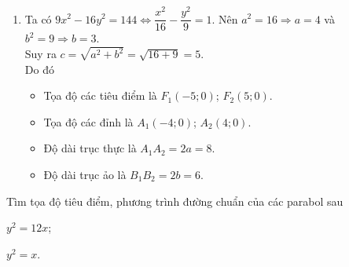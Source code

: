 \begin{baitap}
{\begin{enumerate}
\begin{itemize}
				\item Tọa độ các đỉnh là $A_1 (-4;0)$; $A_2 (4;0)$.
				\item Độ dài trục thực là $A_1 A_2=2a=8$.
				\item Độ dài trục ảo là $B_1 B_2=2b=2$.
			\end{itemize}
			\item Ta có $9x^2-16y^2=144 \Leftrightarrow \dfrac{x^2}{16}-\dfrac{y^2}{9}=1$.
			Nên $a^2=16\Rightarrow a=4$ và $b^2=9\Rightarrow b=3$.\\
			Suy ra $c=\sqrt{a^2+b^2}=\sqrt{16+9}=5$.\\
			Do đó
			\begin{itemize}
				\item Tọa độ các tiêu điểm là $F_1 (-5;0)$; $F_2 (5;0)$.
				\item Tọa độ các đỉnh là $A_1 (-4;0)$; $A_2 (4;0)$.
				\item Độ dài trục thực là $A_1 A_2=2a=8$.
				\item Độ dài trục ảo là $B_1 B_2=2b=6$.
			\end{itemize}
		\end{enumerate}
	}
\end{baitap}

\begin{baitap}%
	Tìm tọa độ tiêu điểm, phương trình đường chuẩn của các parabol sau
	\begin{listEX}[2]
		\item $y^2=12x$;
		\item $y^2=x$.
	\end{listEX}
\end{baitap}

